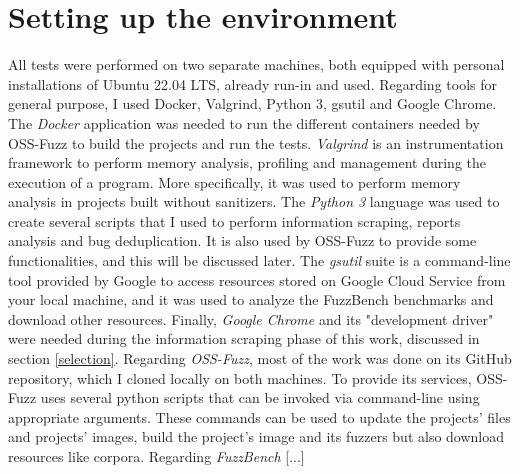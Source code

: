 \documentclass[Lau,oneside]{sapthesis}%
\begin{document}
\newpage
\section{Setting up the environment}
All tests were performed on two separate machines, both equipped with personal installations of Ubuntu 22.04 LTS, already run-in and used.
\newline \newline \newline
Regarding tools for general purpose, I used Docker, Valgrind, Python 3, gsutil and Google Chrome.
\newline \newline
The \textit{Docker} application was needed to run the different containers needed by OSS-Fuzz to build the projects and run the tests.
\newline \newline
\textit{Valgrind} \cite{ref:valgrind} is an instrumentation framework to perform memory analysis, profiling and management during the execution of a program.
More specifically, it was used to perform memory analysis in projects built without sanitizers.
\newline \newline
The \textit{Python 3} language was used to create several scripts that I used to perform information scraping, reports analysis and bug deduplication.
It is also used by OSS-Fuzz to provide some functionalities, and this will be discussed later. 
\newline \newline
The \textit{gsutil} suite is a command-line tool provided by Google to access resources stored on Google Cloud Service from your local machine, and it was used to analyze the FuzzBench benchmarks and download other resources.
\newline \newline
Finally, \textit{Google Chrome} and its "development driver" were needed during the information scraping phase of this work, discussed in section \ref{selection}.
\newline \newline \newline
Regarding \textit{OSS-Fuzz}, most of the work was done on its GitHub repository, which I cloned locally on both machines.
\newline
To provide its services, OSS-Fuzz uses several python scripts that can be invoked via command-line using appropriate arguments. These commands can be used to update the projects' files and projects' images, build the project's image and its fuzzers but also download resources like corpora. 
\newline \newline \newline
Regarding \textit{FuzzBench} [...]
\end{document}
